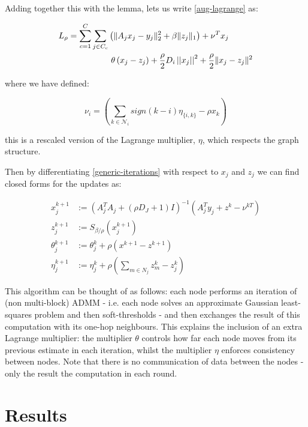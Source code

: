 \documentclass[conference]{IEEEtran}
\begin{document}
Adding together this with the lemma, lets us write \eqref{aug-lagrange} as:

\begin{align}
L_\rho = \sum_{c=1}^C\sum_{j \in C_c} &\left(\|A_jx_j - y_j\|_2^2 + \beta\|z_j\|_1\right) + \nu^Tx_j \nonumber \\
& \text{        } \theta\left(x_j - z_j\right) + \frac{\rho}{2}D_i\vectornorm{x_j}^2 + \frac{\rho }{2}\|x_j-z_j\|^2
\label{generic-iterations}
\end{align}

where we have defined:

\begin{equation}
\nu_i = \left(\sum_{k \in \mathcal{N}_i} sign\left(k-i\right)\eta_{\{i,k\}} - \rho x_k \right)
\end{equation}

this is a rescaled version of the Lagrange multiplier, \(\eta\), which respects the graph structure. 

Then by differentiating \eqref{generic-iterations} with respect to \(x_j\) and \(z_j\) we  can find closed forms for the updates as:

\begin{thm}
\begin{align}
x_j^{k+1} &:= \left(A_j^TA_j + (\rho D_J + 1) I\right)^{-1}\left(A_j^Ty_j +  z^k - \nu^{kT}\right)\\
z_j^{k+1} &:= S_{\beta/\rho}\left(x_j^{k+1} \right)
 \\
\theta_j^{k+1} &:= \theta_j^{k} + \rho \left(x^{k+1}-z^{k+1}\right) \\
\eta_j^{k+1} &:= \eta_j^k + \rho\left(\sum_{m \in N_j} z_m^k - z_j^k\right)
\label{dadmm_algo_lasso}
\end{align}
\end{thm}

This algorithm can be thought of as follows: each node performs an iteration of (non multi-block) ADMM - i.e. each node solves an approximate Gaussian least-squares problem and then soft-thresholds - and then exchanges the result of this computation with its one-hop neighbours. This explains the inclusion of an extra Lagrange multiplier: the multiplier \(\theta\) controls how far each node moves from its previous estimate in each iteration, whilst the multiplier \(\eta\) enforces consistency between nodes. Note that there is no communication of data between the nodes - only the result the computation in each round.

\section{Results} \label{sec:results}
\end{document}
